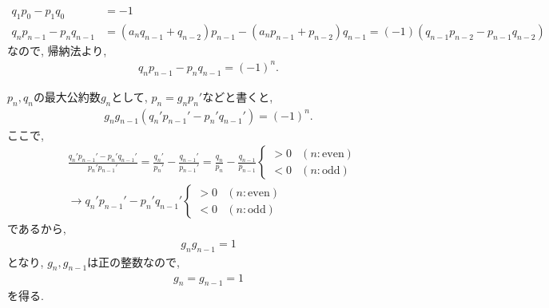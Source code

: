 \begin{ex}
\end{ex}




\begin{ex}
    \begin{align*}
        q_1 p_0 - p_1 q_0 & = -1
        \\
        q_n p_{n-1} - p_n q_{n-1}
                          & =
        (a_n q_{n-1} + q_{n-2}) p_{n-1} - (a_n p_{n-1} + p_{n-2}) q_{n-1}
        =
        (-1)(q_{n-1} p_{n-2} - p_{n-1} q_{n-2})
    \end{align*}
    なので, 帰納法より,
    \begin{align*}
        q_n p_{n-1} - p_n q_{n-1}  = (-1)^n.
    \end{align*}
    \par
    $p_n, q_n$の最大公約数$g_n$として, $p_n = g_n p_n'$などと書くと,
    \begin{align*}
        g_n g_{n-1} \left(q_n' p_{n-1}' - p_n' q_{n-1}' \right) = (-1)^n.
    \end{align*}
    ここで,
    \begin{align*}
         & \frac{q_n' p_{n-1}' - p_n' q_{n-1}'}{p_n' p_{n-1}'}
        =
        \frac{q_n'}{p_n'} - \frac{q_{n-1}'}{p_{n-1}'}
        =
        \frac{q_n}{p_n} - \frac{q_{n-1}}{p_{n-1}}
        \begin{cases}
            > 0 & (n : \mathrm{even}) \\
            < 0 & (n: \mathrm{odd})
        \end{cases}
        \\ &\to
        q_n' p_{n-1}' - p_n' q_{n-1}'
        \begin{cases}
            > 0 & (n : \mathrm{even}) \\
            < 0 & (n: \mathrm{odd})
        \end{cases}
    \end{align*}
    であるから,
    \begin{align*}
        g_n g_{n-1} = 1
    \end{align*}
    となり, $g_n, g_{n-1}$は正の整数なので,
    \begin{align*}
        g_n = g_{n-1} = 1
    \end{align*}
    を得る.
\end{ex}
